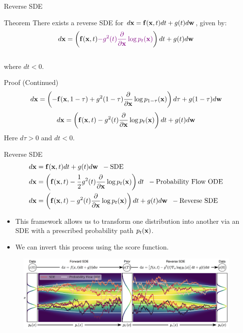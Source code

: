 \documentclass{beamer}
\begin{document}
\begin{frame}{Reverse SDE}
	\begin{block}{Theorem}
		There exists a reverse SDE for $d\mathbf{x} = \mathbf{f}(\mathbf{x}, t) dt + g(t) d \mathbf{w}$, given by:
		\vspace{-0.3cm}
		\[
			d\mathbf{x} = \left(\mathbf{f}(\mathbf{x}, t) {\color{violet}- g^2(t) \frac{\partial}{\partial \mathbf{x}}\log p_t(\mathbf{x})}\right) dt + g(t) d \mathbf{w}
		\]
		\vspace{-0.5cm}\\
		where $dt<0$.
	\end{block}
	\begin{block}{Proof (Continued)}
		\vspace{-0.7cm}
		\[
			d\mathbf{x} = \left(-\mathbf{f}(\mathbf{x}, 1 - \tau) + g^2(1 - \tau) \frac{\partial}{\partial \mathbf{x}} \log p_{1 - \tau}(\mathbf{x}) \right)d\tau + g(1 - \tau) d \mathbf{w}
		\]
		\[
			d\mathbf{x} = \left(\mathbf{f}(\mathbf{x}, t) - g^2(t) \frac{\partial}{\partial \mathbf{x}}\log p_t(\mathbf{x})\right)dt + g(t) d\mathbf{w}
		\]
		Here $d\tau > 0$ and $dt < 0$.
	\end{block}
\end{frame}
\begin{frame}{Reverse SDE}
	\vspace{-0.5cm}
	\begin{align*}
		d\mathbf{x} &= \mathbf{f}(\mathbf{x}, t) dt + g(t) d \mathbf{w} \;\; - \text{SDE} \\
		d\mathbf{x} &= \left(\mathbf{f}(\mathbf{x}, t) -\frac{1}{2} g^2(t) \frac{\partial}{\partial \mathbf{x}} \log p_t(\mathbf{x}) \right) dt \;\; - \text{Probability Flow ODE} \\
		d\mathbf{x} &= \left(\mathbf{f}(\mathbf{x}, t) - g^2(t) \frac{\partial}{\partial \mathbf{x}}\log p_t(\mathbf{x})\right) dt + g(t) d \mathbf{w} \;\; - \text{Reverse SDE}
	\end{align*}
	\vspace{-0.5cm}
	\begin{itemize}
		\item This framework allows us to transform one distribution into another via an SDE with a prescribed probability path $p_t(\mathbf{x})$.
		\item We can invert this process using the score function.
	\end{itemize}
	\vspace{-0.3cm}
	\begin{figure}
		\includegraphics[width=0.9\linewidth]{figs/sde}
	\end{figure}
\end{frame}
\end{document}
